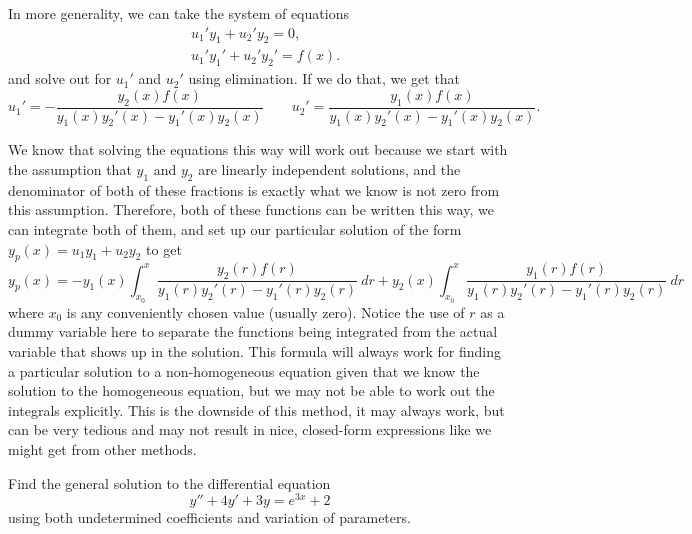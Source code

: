 \documentclass{ximera}
\begin{document}
In more generality, we can take the system of equations 
\begin{equation*}
    \begin{aligned}
        & u_1' y_1 + u_2' y_2 = 0 ,\\
        & u_1' y_1' + u_2' y_2' = f(x) .
    \end{aligned}
\end{equation*}
and solve out for $u_1'$ and $u_2'$ using elimination. If we do that, we get that
\begin{equation*}
    u_1' = -\frac{y_2(x)f(x)}{y_1(x)y_2'(x) - y_1'(x)y_2(x)} \qquad u_2' = \frac{y_1(x)f(x)}{y_1(x)y_2'(x) - y_1'(x)y_2(x)}.
\end{equation*} 

We know that solving the equations this way will work out because we start with the assumption that $y_1$ and $y_2$ are linearly independent solutions, and the denominator of both of these fractions is exactly what we know is not zero from this assumption. Therefore, both of these functions can be written this way, we can integrate both of them, and set up our particular solution of the form $y_p(x) = u_1y_1 + u_2y_2$ to get
\begin{equation}
    y_p(x) = -y_1(x)\int_{x_0}^x \frac{y_2(r)f(r)}{y_1(r)y_2'(r) - y_1'(r)y_2(r)}\ dr + y_2(x)\int_{x_0}^x \frac{y_1(r)f(r)}{y_1(r)y_2'(r) - y_1'(r)y_2(r)}\ dr
    \label{varpar:eqn}
\end{equation}
where $x_0$ is any conveniently chosen value (usually zero). Notice the use of $r$ as a dummy variable here to separate the functions being integrated from the actual variable that shows up in the solution. This formula will always work for finding a particular solution to a non-homogeneous equation given that we know the solution to the homogeneous equation, but we may not be able to work out the integrals explicitly. This is the downside of this method, it may always work, but can be very tedious and may not result in nice, closed-form expressions like we might get from other methods. 

\begin{example}
    Find the general solution to the differential equation
    \begin{equation*}
        y'' + 4y' + 3y = e^{3x} + 2
    \end{equation*}
    using both undetermined coefficients and variation of parameters.
\end{example}
\end{document}

